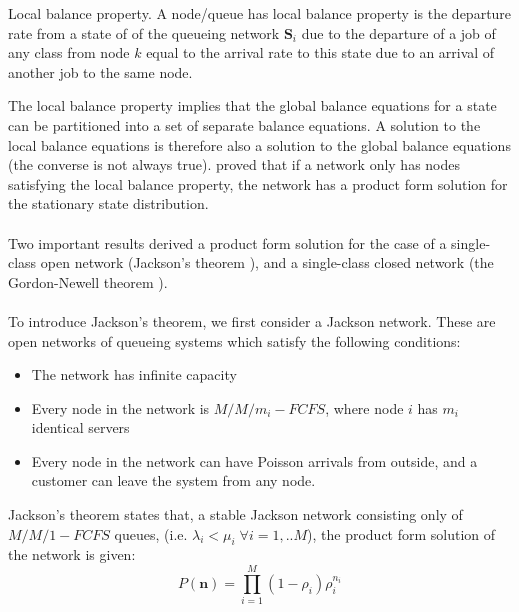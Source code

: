 \begin{definition}
    Local balance property. A node/queue has local balance property is the departure rate from a state of of the queueing network \(\mathbf{S}_i\) due to the departure of a job of any class from node \(k\) equal to the arrival rate to this state due to an arrival of another job to the same node.
\end{definition}

The local balance property implies that the global balance equations for a state can be partitioned into a set of separate balance equations. A solution to the local balance equations is therefore also a solution to the global balance equations (the converse is not always true). \cite{Chandy1977ProductNetworks} proved that if a network only has nodes satisfying the local balance property, the network has a product form solution for the stationary state distribution.
\\\\
Two important results derived a product form solution for the case of a single-class open network (Jackson's theorem \cite{Jackson2004Jobshop-LikeSystems}), and a single-class closed network (the Gordon-Newell theorem \cite{Gordon1967ClosedServers}). 
\\\\
To introduce Jackson's theorem, we first consider a Jackson network. These are open networks of queueing systems which satisfy the following conditions:
\begin{itemize}
    \item The network has infinite capacity
    \item Every node in the network is \(M/M/m_i-FCFS\), where node \(i\) has \(m_i\) identical servers
    \item Every node in the network can have Poisson arrivals from outside, and a customer can leave the system from any node.
\end{itemize}
\begin{theorem}
    Jackson's theorem states that, a stable Jackson network consisting only of \(M/M/1-FCFS\) queues, (i.e. \(\lambda_i < \mu_i \; \forall i = 1, .. M\)), the product form solution of the network is given:
    \begin{equation}
        P(\mathbf{n}) = \prod_{i=1}^M (1-\rho_i) \rho_i^{n_i}
    \end{equation}
\end{theorem}


